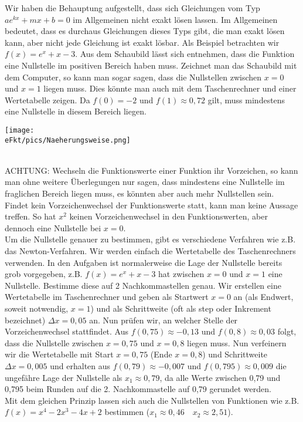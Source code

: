 Wir haben die Behauptung aufgestellt, dass sich Gleichungen vom Typ \(ae^{kx}+mx+b=0\) im Allgemeinen nicht exakt lösen lassen. Im Allgemeinen bedeutet, dass es durchaus Gleichungen dieses Typs gibt, die man exakt lösen kann, aber nicht jede Gleichung ist exakt lösbar. Als Beispiel betrachten wir \(f(x)=e^x+x-3\). Aus dem Schaubild lässt sich entnehmen, dass die Funktion eine Nullstelle im positiven Bereich haben muss. Zeichnet man das Schaubild mit dem Computer, so kann man sogar sagen, dass die Nullstellen zwischen \(x=0\) und \(x=1\) liegen muss. Dies könnte man auch mit dem Taschenrechner und einer Wertetabelle zeigen. Da \(f(0)=-2\) und \(f(1)\approx 0,72\) gilt, muss mindestens eine Nullstelle in diesem Bereich liegen.\\
\begin{minipage}[t]{\textwidth}
	\centering\texttt{[image: \\eFkt/pics/Naeherungsweise.png]}
\end{minipage}\\
ACHTUNG: Wechseln die Funktionswerte einer Funktion ihr Vorzeichen, so kann man ohne weitere Überlegungen nur sagen, dass mindestens eine Nullstelle im fraglichen Bereich liegen muss, es könnten aber auch mehr Nullstellen sein. Findet kein Vorzeichenwechsel der Funktionswerte statt, kann man keine Aussage treffen. So hat \(x^2\) keinen Vorzeichenwechsel in den Funktionswerten, aber dennoch eine Nullstelle bei \(x=0\).\\
Um die Nullstelle genauer zu bestimmen, gibt es verschiedene Verfahren wie z.B. das Newton-Verfahren. Wir werden einfach die Wertetabelle des Taschenrechners verwenden. In den Aufgaben ist normalerweise die Lage der Nullstelle bereits grob vorgegeben, z.B. \(f(x)=e^x+x-3\) hat zwischen \(x=0\) und \(x=1\) eine Nullstelle. Bestimme diese auf 2 Nachkommastellen genau. Wir erstellen eine Wertetabelle im Taschenrechner und geben als Startwert \(x=0\) an (als Endwert, soweit notwendig, \(x=1\)) und als Schrittweite (oft als step oder Inkrement bezeichnet) \(\Delta x=0,05\) an. Nun prüfen wir, an welcher Stelle der Vorzeichenwechsel stattfindet. Aus \(f(0,75)\approx -0,13\) und \(f(0,8)\approx 0,03\) folgt, dass die Nullstelle zwischen \(x=0,75\) und \(x=0,8\) liegen muss. Nun verfeinern wir die Wertetabelle mit Start \(x=0,75\) (Ende \(x=0,8\)) und Schrittweite \(\Delta x=0,005\) und erhalten aus \(f(0,79)\approx -0,007\) und \(f(0,795)\approx 0,009\) die ungefähre Lage der Nullstelle als \(x_1\approx 0,79\), da alle Werte zwischen 0,79 und 0,795 beim Runden auf die 2. Nachkommastelle auf 0,79 gerundet werden.\\
Mit dem gleichen Prinzip lassen sich auch die Nullstellen von Funktionen wie z.B.\\\(f(x)=x^4-2x^3-4x+2\) bestimmen (\(x_1\approx 0,46\quad x_2\approx 2,51\)).

